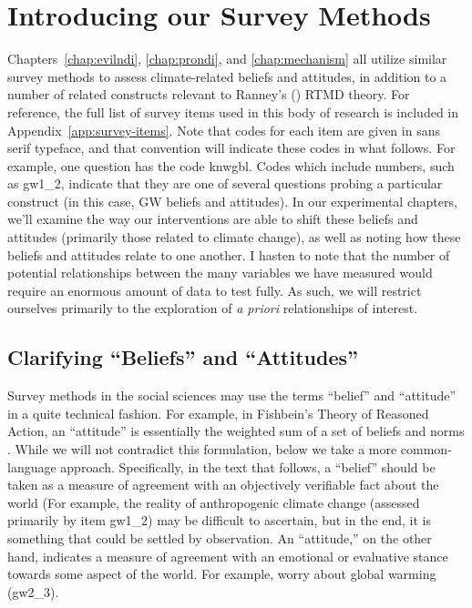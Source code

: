 \graphicspath{{survey-methods/}}

\chapter{Introducing our Survey Methods}
\label{chap:survey}

Chapters~\ref{chap:evilndi}, \ref{chap:prondi}, and \ref{chap:mechanism} all
utilize similar survey methods to assess climate-related beliefs and attitudes,
in addition to a number of related constructs relevant to Ranney's
(\citeyear{ranney_why_2012}) RTMD theory. For reference, the full list of survey
items used in this body of research is included in
Appendix~\ref{app:survey-items}. Note that codes for each item are given in
\textsf{sans serif} typeface, and that convention will indicate these codes in
what follows. For example, one question has the code \textsf{knwgbl}. Codes
which include numbers, such as \textsf{gw1_2}, indicate that they are one of
several questions probing a particular construct (in this case, GW beliefs and
attitudes).  In our experimental chapters, we'll examine the way our
interventions are able to shift these beliefs and attitudes (primarily those
related to climate change), as well as noting how these beliefs and attitudes
relate to one another.  I hasten to note that the number of potential
relationships between the many variables we have measured would require an
enormous amount of data to test fully. As such, we will restrict ourselves
primarily to the exploration of \emph{a priori} relationships of interest.

\section{Clarifying \texorpdfstring{“Beliefs”}{"Beliefs"} and
    \texorpdfstring{“Attitudes”}{"Attitudes"}}

Survey methods in the social sciences may use the terms “belief” and “attitude”
in a quite technical fashion. For example, in Fishbein's Theory of Reasoned
Action, an “attitude” is essentially the weighted sum of a set of beliefs and
norms \parencite[see][for an overview of such theories]{montano_theory_2008}.
While we will not contradict this formulation, below we take a more
common-language approach. Specifically, in the text that follows, a “belief”
should be taken as a measure of agreement with an objectively verifiable fact
about the world (For example, the reality of anthropogenic climate
change (assessed primarily by item \textsf{gw1_2}) may be difficult to
ascertain, but in the end, it is something that could be settled by observation.
An “attitude,” on the other hand, indicates a measure of agreement with an
emotional or evaluative stance towards some aspect of the world.  For example,
worry about global warming (\textsf{gw2_3}).

